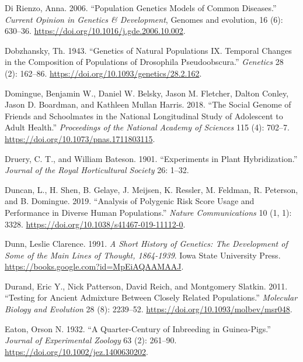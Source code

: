 \documentclass[
]{book}
\newlength{\cslhangindent}
\newlength{\cslentryspacingunit} %
\newenvironment{CSLReferences}[2] %
 {%
  \setlength{\parindent}{0pt}
  \ifodd #1
  \let\oldpar\par
  \def\par{\hangindent=\cslhangindent\oldpar}
  \fi
  \setlength{\parskip}{#2\cslentryspacingunit}
 }%
 {}
\begin{document}
\begin{CSLReferences}{1}{0}
\leavevmode{}%
Di Rienzo, Anna. 2006. {``Population Genetics Models of Common Diseases.''} \emph{Current Opinion in Genetics \& Development}, Genomes and evolution, 16 (6): 630--36. \url{https://doi.org/10.1016/j.gde.2006.10.002}.

\leavevmode{}%
Dobzhansky, Th. 1943. {``Genetics of Natural Populations {IX}. {Temporal} Changes in the Composition of Populations of Drosophila Pseudoobscura.''} \emph{Genetics} 28 (2): 162--86. \url{https://doi.org/10.1093/genetics/28.2.162}.

\leavevmode{}%
Domingue, Benjamin W., Daniel W. Belsky, Jason M. Fletcher, Dalton Conley, Jason D. Boardman, and Kathleen Mullan Harris. 2018. {``The Social Genome of Friends and Schoolmates in the {National Longitudinal Study} of {Adolescent} to {Adult Health}.''} \emph{Proceedings of the National Academy of Sciences} 115 (4): 702--7. \url{https://doi.org/10.1073/pnas.1711803115}.

\leavevmode{}%
Druery, C. T., and William Bateson. 1901. {``Experiments in Plant Hybridization.''} \emph{Journal of the Royal Horticultural Society} 26: 1--32.

\leavevmode{}%
Duncan, L., H. Shen, B. Gelaye, J. Meijsen, K. Ressler, M. Feldman, R. Peterson, and B. Domingue. 2019. {``Analysis of Polygenic Risk Score Usage and Performance in Diverse Human Populations.''} \emph{Nature Communications} 10 (1, 1): 3328. \url{https://doi.org/10.1038/s41467-019-11112-0}.

\leavevmode{}%
Dunn, Leslie Clarence. 1991. \emph{A {Short History} of {Genetics}: {The Development} of {Some} of the {Main Lines} of {Thought}, 1864-1939}. {Iowa State University Press}. \url{https://books.google.com?id=MpEiAQAAMAAJ}.

\leavevmode{}%
Durand, Eric Y., Nick Patterson, David Reich, and Montgomery Slatkin. 2011. {``Testing for {Ancient Admixture} Between {Closely Related Populations}.''} \emph{Molecular Biology and Evolution} 28 (8): 2239--52. \url{https://doi.org/10.1093/molbev/msr048}.

\leavevmode{}%
Eaton, Orson N. 1932. {``A Quarter-Century of Inbreeding in Guinea-Pigs.''} \emph{Journal of Experimental Zoology} 63 (2): 261--90. \url{https://doi.org/10.1002/jez.1400630202}.


\end{CSLReferences}
\end{document}
